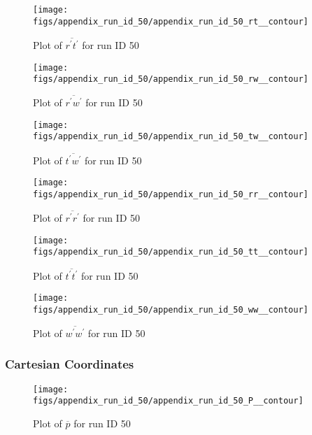 \begin{figure}[H]
\centering
\texttt{[image: figs/appendix\_run\_id\_50/appendix\_run\_id\_50\_rt\_\_contour]}
\caption{Plot of $\overline{r^\prime t^\prime}$ for run ID 50}
\label{fig:appendix_run_id_50_rt__contour}
\end{figure}


\begin{figure}[H]
\centering
\texttt{[image: figs/appendix\_run\_id\_50/appendix\_run\_id\_50\_rw\_\_contour]}
\caption{Plot of $\overline{r^\prime w^\prime}$ for run ID 50}
\label{fig:appendix_run_id_50_rw__contour}
\end{figure}


\begin{figure}[H]
\centering
\texttt{[image: figs/appendix\_run\_id\_50/appendix\_run\_id\_50\_tw\_\_contour]}
\caption{Plot of $\overline{t^\prime w^\prime}$ for run ID 50}
\label{fig:appendix_run_id_50_tw__contour}
\end{figure}


\begin{figure}[H]
\centering
\texttt{[image: figs/appendix\_run\_id\_50/appendix\_run\_id\_50\_rr\_\_contour]}
\caption{Plot of $\overline{r^\prime r^\prime}$ for run ID 50}
\label{fig:appendix_run_id_50_rr__contour}
\end{figure}


\begin{figure}[H]
\centering
\texttt{[image: figs/appendix\_run\_id\_50/appendix\_run\_id\_50\_tt\_\_contour]}
\caption{Plot of $\overline{t^\prime t^\prime}$ for run ID 50}
\label{fig:appendix_run_id_50_tt__contour}
\end{figure}


\begin{figure}[H]
\centering
\texttt{[image: figs/appendix\_run\_id\_50/appendix\_run\_id\_50\_ww\_\_contour]}
\caption{Plot of $\overline{w^\prime w^\prime}$ for run ID 50}
\label{fig:appendix_run_id_50_ww__contour}
\end{figure}


\subsubsection{Cartesian Coordinates}
\begin{figure}[H]
\centering
\texttt{[image: figs/appendix\_run\_id\_50/appendix\_run\_id\_50\_P\_\_contour]}
\caption{Plot of $\overline{p}$ for run ID 50}
\label{fig:appendix_run_id_50_P__contour}
\end{figure}


